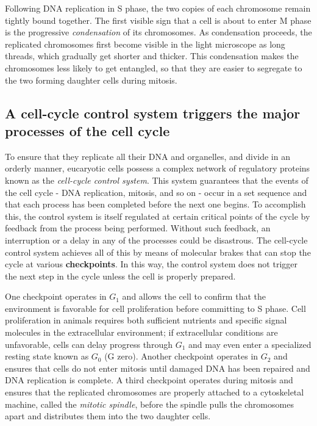Following DNA replication in S phase, the two copies of each chromosome
remain tightly bound together. The first visible sign that a cell is
about to enter M phase is the progressive \textit{condensation} of its chromosomes.
As condensation proceeds, the replicated chromosomes first
become visible in the light microscope as long threads, which gradually
get shorter and thicker. This condensation makes the chromosomes less
likely to get entangled, so that they are easier to segregate to the two
forming daughter cells during mitosis.

\subsection{A cell-cycle control system triggers the major processes of the cell cycle}

To ensure that they replicate all their DNA and organelles, and divide
in an orderly manner, eucaryotic cells possess a complex network of
regulatory proteins known as the \textit{cell-cycle control system}. This system
guarantees that the events of the cell cycle - DNA replication, mitosis,
and so on - occur in a set sequence and that each process has been completed
before the next one begins. To accomplish this, the control system
is itself regulated at certain critical points of the cycle by feedback from
the process being performed. Without such feedback, an interruption or
a delay in any of the processes could be disastrous. The cell-cycle
control system achieves all of this by means of molecular brakes that
can stop the cycle at various \textbf{checkpoints}. In this way, the control system
does not trigger the next step in the cycle unless the cell is properly
prepared.

One checkpoint operates in $G_1$ and allows
the cell to confirm that the environment is favorable for cell proliferation
before committing to S phase. Cell proliferation in animals requires
both sufficient nutrients and specific signal molecules in the extracellular
environment; if extracellular conditions are unfavorable, cells can delay
progress through $G_1$ and may even enter a specialized resting state known
as $G_0$ (G zero). Another checkpoint operates in $G_2$ and ensures that
cells do not enter mitosis until damaged DNA
has been repaired and DNA replication is complete. A third checkpoint
operates during mitosis and ensures that the replicated chromosomes
are properly attached to a cytoskeletal machine, called the \textit{mitotic spindle},
before the spindle pulls the chromosomes apart and distributes them into
the two daughter cells.

